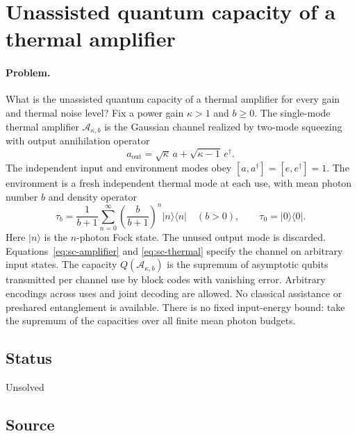 \section{Unassisted quantum capacity of a thermal amplifier}
\label{sec:op_9966229e2ac69eee}

\paragraph{Problem.}
What is the unassisted quantum capacity of a thermal amplifier for every gain and thermal noise level?
Fix a power gain $\kappa>1$ and $b\geq0$. The single-mode thermal amplifier $\mathcal A_{\kappa,b}$ is the Gaussian channel realized by two-mode squeezing with output annihilation operator
\begin{equation}
 a_{\mathrm{out}}=\sqrt\kappa\,a+\sqrt{\kappa-1}\,e^\dagger.
 \label{eq:sc-amplifier}
\end{equation}
The independent input and environment modes obey $[a,a^\dagger]=[e,e^\dagger]=1$. The environment is a fresh independent thermal mode at each use, with mean photon number $b$ and density operator
\begin{equation}
 \tau_b=\frac1{b+1}\sum_{n=0}^{\infty}\left(\frac b{b+1}\right)^n|n\rangle\langle n|\quad(b>0),\qquad \tau_0=|0\rangle\langle0|.
 \label{eq:sc-thermal}
\end{equation}
Here $|n\rangle$ is the $n$-photon Fock state. The unused output mode is discarded.
Equations~\eqref{eq:sc-amplifier} and \eqref{eq:sc-thermal} specify the channel on arbitrary input states.
The capacity $Q(\mathcal A_{\kappa,b})$ is the supremum of asymptotic qubits transmitted per channel use by block codes with vanishing error. Arbitrary encodings across uses and joint decoding are allowed. No classical assistance or preshared entanglement is available. There is no fixed input-energy bound: take the supremum of the capacities over all finite mean photon budgets.

\subsection*{Status}

Unsolved

\subsection*{Source}

